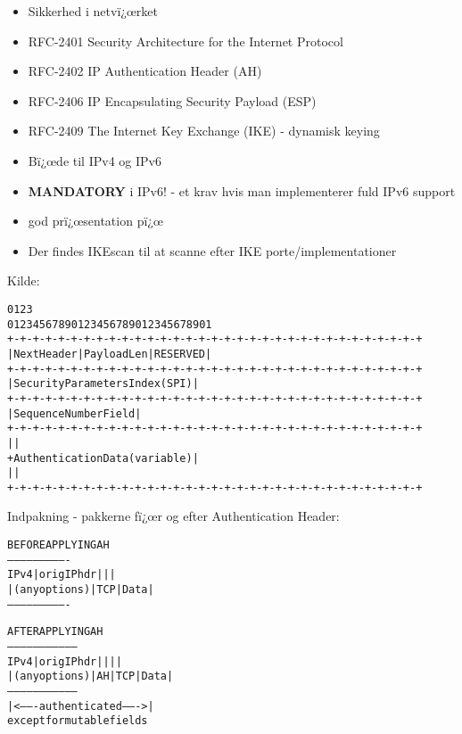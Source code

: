 
\begin{itemize}
\item Sikkerhed i netvï¿œrket
\item RFC-2401 Security Architecture for the Internet Protocol
\item RFC-2402 IP Authentication Header (AH)
\item RFC-2406 IP Encapsulating Security Payload (ESP)
\item RFC-2409 The Internet Key Exchange (IKE) - dynamisk keying
\item Bï¿œde til IPv4 og IPv6
\item {\bfseries MANDATORY} i IPv6! - et krav hvis man implementerer
  fuld IPv6 support
\item god prï¿œsentation pï¿œ 
\item Der findes IKEscan til at scanne efter IKE
  porte/implementationer\\
\end{itemize}


\centerline{Kilde: }



\begin{alltt}
\small
    0                   1                   2                   3
    0 1 2 3 4 5 6 7 8 9 0 1 2 3 4 5 6 7 8 9 0 1 2 3 4 5 6 7 8 9 0 1
   +-+-+-+-+-+-+-+-+-+-+-+-+-+-+-+-+-+-+-+-+-+-+-+-+-+-+-+-+-+-+-+-+
   | Next Header   |  Payload Len  |          RESERVED             |
   +-+-+-+-+-+-+-+-+-+-+-+-+-+-+-+-+-+-+-+-+-+-+-+-+-+-+-+-+-+-+-+-+
   |                 Security Parameters Index (SPI)               |
   +-+-+-+-+-+-+-+-+-+-+-+-+-+-+-+-+-+-+-+-+-+-+-+-+-+-+-+-+-+-+-+-+
   |                    Sequence Number Field                      |
   +-+-+-+-+-+-+-+-+-+-+-+-+-+-+-+-+-+-+-+-+-+-+-+-+-+-+-+-+-+-+-+-+
   |                                                               |
   +                Authentication Data (variable)                 |
   |                                                               |
   +-+-+-+-+-+-+-+-+-+-+-+-+-+-+-+-+-+-+-+-+-+-+-+-+-+-+-+-+-+-+-+-+
\end{alltt}


Indpakning - pakkerne fï¿œr og efter Authentication Header:
\begin{alltt}
\small
                BEFORE APPLYING AH
            ----------------------------
      IPv4  |orig IP hdr  |     |      |
            |(any options)| TCP | Data |
            ----------------------------

                  AFTER APPLYING AH
            ---------------------------------
      IPv4  |orig IP hdr  |    |     |      |
            |(any options)| AH | TCP | Data |
            ---------------------------------
            |<------- authenticated ------->|
                 except for mutable fields
\end{alltt}

